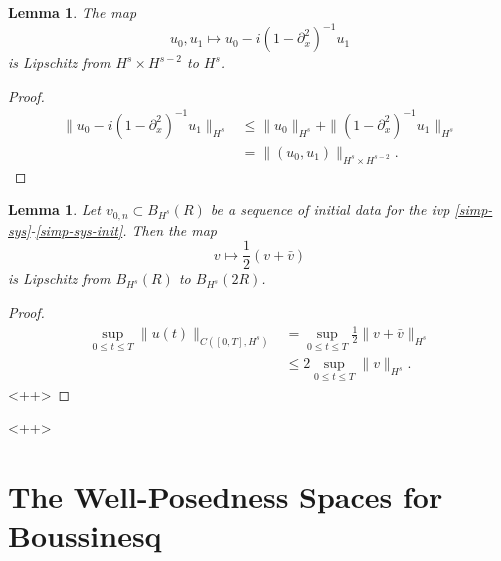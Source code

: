 \documentclass{amsart}
\newtheorem{lemma}[theorem]{Lemma}
\newcommand{\p}{\partial}
\begin{document}
%
%
%
%
%
%
%
%
\begin{lemma}
  The map $$u_{0}, u_{1} \mapsto 
  u_{0} - i(1 - \p_{x}^{2})^{-1}u_{1}$$ is Lipschitz from $H^{s} \times
  H^{s-2}$ to $H^{s}$.
\label{lem:lip-init-data}
\end{lemma}
%
%
%
%
\begin{proof}
%
%
\begin{equation*}
\begin{split}
  \| u_{0} - i(1 - \p_{x}^{2})^{-1} u_{1} \|_{H^{s}} 
  & \le \| u_{0} \|_{H^{s}} + \| (1 - \p_{x}^{2})^{-1} u_{1} \|_{H^{s}}
  \\
  & = \| (u_{0}, u_{1}) \|_{H^{s} \times H^{s-2}}.
\end{split}
\end{equation*}
%
%
\end{proof}
%
%
%
%
%
%
%
%
%
%
\begin{lemma}
  Let $v_{0,n} \subset B_{H^{s}}(R)$ be a sequence of initial data for the ivp
  \eqref{simp-sys}-\eqref{simp-sys-init}. Then the map $$v \mapsto
  \frac{1}{2}(v + \bar{v})$$ is Lipschitz from $B_{H^{s}}(R)$ to $B_{H^{s}}(2R)$.
\label{lem:}
\end{lemma}
%
%
%
%
\begin{proof}
%
%
\begin{equation*}
\begin{split}
  \sup_{0 \le t \le T} \| u(t) \|_{C\left( [0, T], H^{s} \right)}
  & = \sup_{0 \le t \le T} \frac{1}{2} \| v + \bar v \|_{H^{s}}
  \\
  & \le 2 \sup_{0 \le t \le T} \| v \|_{H^{s}}.
\end{split}
\end{equation*}
%
%
<++>
\end{proof}
%
%
<++>
%
%
%
%
%
\section{The Well-Posedness Spaces for Boussinesq}
\end{document}
